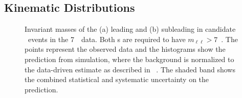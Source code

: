 {\subsection{Kinematic Distributions}

\begin{figure}[htbp]
    \begin{center}
    \label{fig:zzdists-Zmass-seven}
    \caption[Invariant masses of the (a) leading and (b) subleading \leppair
    in candidate \ZZ\ events in the 7~\tev\ data.]
    {Invariant masses of the (a) leading and (b) subleading \leppair
    in candidate \ZZ\ events in the 7~\tev\ data. Both \leppair s are required to have
    $m_{\ell\ell}>7$~\gev.  The points represent the observed data and the
    histograms show the prediction from simulation, where the background is
    normalized to the data-driven estimate as described in
    ~. The shaded band shows the combined statistical and
    systematic uncertainty on the prediction. 
}
\end{center}
\end{figure}

}
